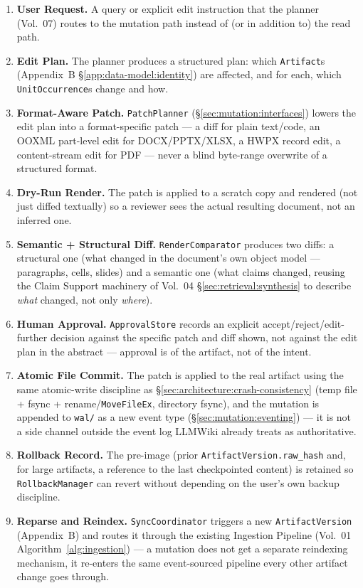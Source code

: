 \begin{enumerate}
  \item \textbf{User Request.} A query or explicit edit instruction that the planner (Vol.~07) routes to the mutation path instead of (or in addition to) the read path.
  \item \textbf{Edit Plan.} The planner produces a structured plan: which \texttt{Artifact}s (Appendix~B \S\ref{app:data-model:identity}) are affected, and for each, which \texttt{UnitOccurrence}s change and how.
  \item \textbf{Format-Aware Patch.} \texttt{PatchPlanner} (\S\ref{sec:mutation:interfaces}) lowers the edit plan into a format-specific patch --- a diff for plain text/code, an OOXML part-level edit for DOCX/PPTX/XLSX, a HWPX record edit, a content-stream edit for PDF --- never a blind byte-range overwrite of a structured format.
  \item \textbf{Dry-Run Render.} The patch is applied to a scratch copy and rendered (not just diffed textually) so a reviewer sees the actual resulting document, not an inferred one.
  \item \textbf{Semantic + Structural Diff.} \texttt{RenderComparator} produces two diffs: a structural one (what changed in the document's own object model --- paragraphs, cells, slides) and a semantic one (what claims changed, reusing the Claim Support machinery of Vol.~04 \S\ref{sec:retrieval:synthesis} to describe \emph{what} changed, not only \emph{where}).
  \item \textbf{Human Approval.} \texttt{ApprovalStore} records an explicit accept/reject/edit-further decision against the specific patch and diff shown, not against the edit plan in the abstract --- approval is of the artifact, not of the intent.
  \item \textbf{Atomic File Commit.} The patch is applied to the real artifact using the same atomic-write discipline as \S\ref{sec:architecture:crash-consistency} (temp file + fsync + rename/\texttt{MoveFileEx}, directory fsync), and the mutation is appended to \texttt{wal/} as a new event type (\S\ref{sec:mutation:eventing}) --- it is not a side channel outside the event log LLMWiki already treats as authoritative.
  \item \textbf{Rollback Record.} The pre-image (prior \texttt{ArtifactVersion.raw\_hash} and, for large artifacts, a reference to the last checkpointed content) is retained so \texttt{RollbackManager} can revert without depending on the user's own backup discipline.
  \item \textbf{Reparse and Reindex.} \texttt{SyncCoordinator} triggers a new \texttt{ArtifactVersion} (Appendix~B) and routes it through the existing Ingestion Pipeline (Vol.~01 Algorithm~\ref{alg:ingestion}) --- a mutation does not get a separate reindexing mechanism, it re-enters the same event-sourced pipeline every other artifact change goes through.
\end{enumerate}

